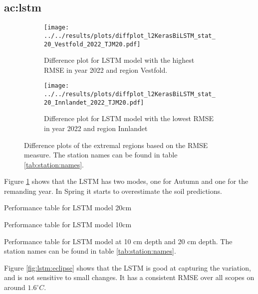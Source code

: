 \subsection{\acrfull{ac:lstm}}

\begin{figure}
	\begin{subfigure}{0.45\textwidth}
		\centering
		\texttt{[image: ../../results/plots/diffplot\_l2KerasBiLSTM\_stat\_20\_Vestfold\_2022\_TJM20.pdf]}
		\caption[Difference plot of LSTM model with highest RMSE]{Difference plot for LSTM model with the highest RMSE in year 2022 and region Vestfold.}
	\end{subfigure}
	\hfill
	\begin{subfigure}{0.45\textwidth}
		\centering
		\texttt{[image: ../../results/plots/diffplot\_l2KerasBiLSTM\_stat\_20\_Innlandet\_2022\_TJM20.pdf]}
		\caption[Difference plot of LSTM model with lowest RMSE]{Difference plot for LSTM model with the lowest RMSE in year 2022 and region Innlandet}
	\end{subfigure}
		\caption[Difference plots of extremal regions LSTM]{Difference plots of the extremal regions based on the RMSE measure. The station names can be found in table \ref{tab:station:names}.}
		\label{fig:lstm:bestworst}
\end{figure}

Figure \ref{fig:lstm:bestworst} shows that the LSTM has two modes, one for Autumn and one for the remanding year. In Spring it starts to overestimate the soil predictions. 

\begin{table}
	\begin{subtable}{0.8\textwidth}
		
		\caption{Performance table for LSTM model 20cm}
	\end{subtable}
	\begin{subtable}{0.8\textwidth}
		
		\caption{Performance table for LSTM model 10cm}
	\end{subtable}
	\caption{Performance table for LSTM model at 10 cm depth and 20 cm depth. The station names can be found in table \ref{tab:station:names}.}
	\label{fig:lstm:eclipse}
\end{table}

Figure \ref{fig:lstm:eclipse} shows that the LSTM is good at capturing the variation, and is not sensitive to small changes. It has a consistent RMSE over all scopes on around $1.6^\circ C$.

